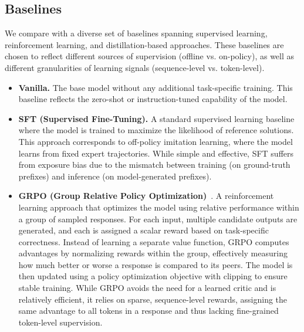 \begin{itemize}
\end{itemize}








\subsection{Baselines}
\label{app:baselines}


We compare \ourmodel with a diverse set of baselines spanning supervised learning, reinforcement learning, and distillation-based approaches. These baselines are chosen to reflect different sources of supervision (offline vs. on-policy), as well as different granularities of learning signals (sequence-level vs. token-level).

\begin{itemize}

\item \textbf{Vanilla.}
The base model without any additional task-specific training. This baseline reflects the zero-shot or instruction-tuned capability of the model.

\item \textbf{SFT (Supervised Fine-Tuning).}
A standard supervised learning baseline where the model is trained to maximize the likelihood of reference solutions. This approach corresponds to off-policy imitation learning, where the model learns from fixed expert trajectories. While simple and effective, SFT suffers from exposure bias due to the mismatch between training (on ground-truth prefixes) and inference (on model-generated prefixes).

\item \textbf{GRPO (Group Relative Policy Optimization)}~\citep{grpo}.
A reinforcement learning approach that optimizes the model using relative performance within a group of sampled responses. For each input, multiple candidate outputs are generated, and each is assigned a scalar reward based on task-specific correctness. Instead of learning a separate value function, GRPO computes advantages by normalizing rewards within the group, effectively measuring how much better or worse a response is compared to its peers. The model is then updated using a policy optimization objective with clipping to ensure stable training. While GRPO avoids the need for a learned critic and is relatively efficient, it relies on sparse, sequence-level rewards, assigning the same advantage to all tokens in a response and thus lacking fine-grained token-level supervision.


\end{itemize}
